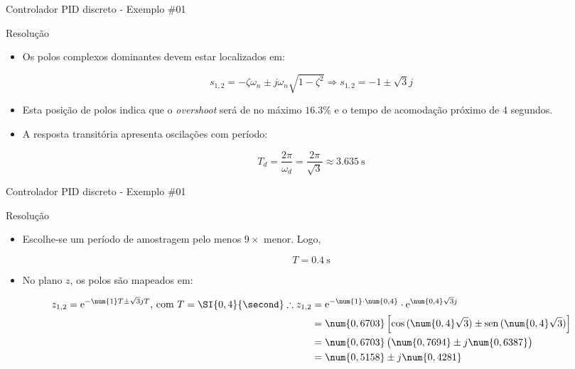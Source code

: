 \begin{frame}{Controlador PID discreto - Exemplo \#01}
\begin{block}{Resolução}
\begin{itemize}
    \item Os polos complexos dominantes devem estar localizados em:
\end{itemize}
$$s_{1,2}=-\zeta\omega_n\pm j\omega_n\sqrt{1-\zeta^{2}}\Rightarrow s_{1,2}=-1\pm\sqrt{3}j$$
\begin{itemize}
    \item Esta posição de polos indica que o \textit{overshoot} será de no máximo $\num{16,3}\% $ e o tempo de acomodação próximo de 4 segundos.
\end{itemize}
\begin{itemize}
    \item A resposta transitória apresenta oscilações com período:
\end{itemize}
$$T_d=\dfrac{2\pi}{\omega_d}=\dfrac{2\pi}{\sqrt{3}}\approx\SI{3,635}{\second}$$
\end{block}
\end{frame}


\begin{frame}{Controlador PID discreto - Exemplo \#01}
\begin{block}{Resolução}
\begin{itemize}
    \item Escolhe-se um período de amostragem pelo menos $ 9\times $ menor. Logo,
\end{itemize}
	 
	\[ T=\SI{0,4}{\second} \]

\begin{itemize}
    \item No plano $z$, os polos são mapeados em:
\end{itemize}
\begin{align*}
		z_{1,2}=\text{e}^{-\num{1}T\pm\sqrt{3} jT}\text{, com } T=\SI{0,4}{\second}\therefore
		z_{1,2}&=\text{e}^{-\num{1}\cdot\num{0,4}}\cdot\text{e}^{\num{0,4}\sqrt{3} j}\\
		&=\num{0,6703}\left[ \cos{(\num{0,4}\tikzmark{p1}\sqrt{3})}\pm\sen{(\num{0,4}\tikzmark{p2}\sqrt{3})}\right]\\
		&=\num{0,6703}\left( \num{0,7694}\pm j\num{0,6387} \right)\\
		&=\num{0,5158}\pm j\num{0,4281}
		\end{align*}
\end{block}
\end{frame}



